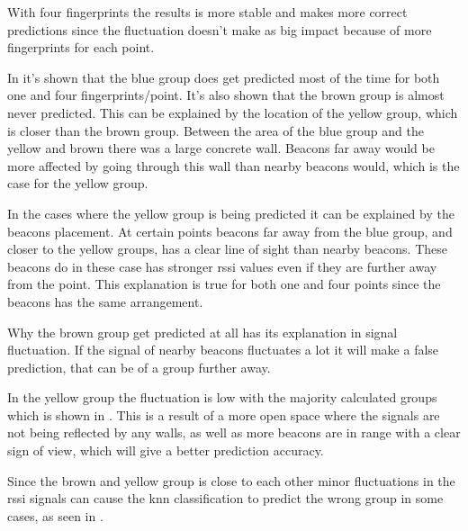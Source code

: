 \bigskip

With four fingerprints the results is more stable and makes more correct predictions since the fluctuation doesn't make as big impact because of more fingerprints for each point.


In  it's shown that the blue group does get predicted most of the time for both one and four fingerprints/point.
It's also shown that the brown group is almost never predicted.
This can be explained by the location of the yellow group, which is closer than the brown group.
Between the area of the blue group and the yellow and brown there was a large concrete wall.
Beacons far away would be more affected by going through this wall than nearby beacons would, which is the case for the yellow group.

\bigskip

In the cases where the yellow group is being predicted it can be explained by the beacons placement.
At certain points beacons far away from the blue group, and closer to the yellow groups, has a clear line of sight than nearby beacons.
These beacons do in these case has stronger \acrshort{rssi} values even if they are further away from the point.
This explanation is true for both one and four points since the beacons has the same arrangement.

\bigskip

Why the brown group get predicted at all has its explanation in signal fluctuation.
If the signal of nearby beacons fluctuates a lot it will make a false prediction, that can be of a group further away.


In the yellow group the fluctuation is low with the majority calculated groups which is shown in .
This is a result of a more open space where the signals are not being reflected by any walls, as well as more beacons are in range with a clear sign of view, which will give a better prediction accuracy.

\bigskip

Since the brown and yellow group is close to each other minor fluctuations in the \acrshort{rssi} signals can cause the \acrshort{knn} classification to predict the wrong group in some cases, as seen in .

